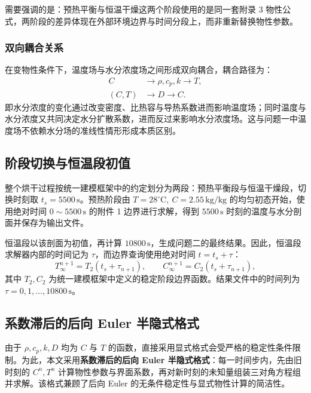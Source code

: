 \documentclass[withoutpreface,bwprint]{cumcm_thesis}
\begin{document}
需要强调的是：预热平衡与恒温干燥这两个阶段使用的是同一套附录 3 物性公式，两阶段的差异体现在外部环境边界与时间分段上，而非重新替换物性参数。

\subsubsection{双向耦合关系}

在变物性条件下，温度场与水分浓度场之间形成双向耦合，耦合路径为：
\begin{align*}
    C &\rightarrow \rho, c_p, k \rightarrow T, \\
    (C,T) &\rightarrow D \rightarrow C.
\end{align*}
即水分浓度的变化通过改变密度、比热容与导热系数进而影响温度场；同时温度与水分浓度又共同决定水分扩散系数，进而反过来影响水分浓度场。这与问题一中温度场不依赖水分场的准线性情形形成本质区别。

\subsection{阶段切换与恒温段初值}

整个烘干过程按统一建模框架中的约定划分为两段：预热平衡段与恒温干燥段，切换时刻取 \(t_s = 5500\,\text{s}\)。预热阶段由 \(T = 28^{\circ}\text{C},\ C = 2.55\,\text{kg/kg}\) 的均匀初态开始，使用绝对时间 \(0\sim5500\,\text{s}\) 的附件 1 边界进行求解，得到 \(5500\,\text{s}\) 时刻的温度与水分剖面并保存为输出文件。

恒温段以该剖面为初值，再计算 \(10800\,\text{s}\)，生成问题二的最终结果。因此，恒温段求解器内部的时间记为 \(\tau\)，而边界查询使用绝对时间 \(t = t_s + \tau\)：
\begin{equation}
T_\infty^{n+1} = T_2(t_s + \tau_{n+1}), \qquad C_\infty^{n+1} = C_2(t_s + \tau_{n+1}),
\end{equation}
其中 \(T_2, C_2\) 为统一建模框架中定义的稳定阶段边界函数。结果文件中的时间列为 \(\tau = 0,1,\dots,10800\,\text{s}\)。

\subsection{系数滞后的后向 Euler 半隐式格式}

由于 \(\rho, c_p, k, D\) 均为 \(C\) 与 \(T\) 的函数，直接采用显式格式会受严格的稳定性条件限制。为此，本文采用\textbf{系数滞后的后向 Euler 半隐式格式}：每一时间步内，先由旧时刻的 \(C^n, T^n\) 计算物性参数与界面系数，再对新时刻的未知量组装三对角方程组并求解。该格式兼顾了后向 Euler 的无条件稳定性与显式物性计算的简洁性。
\end{document}
